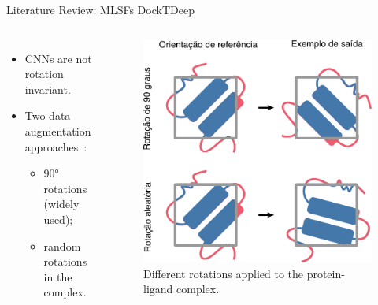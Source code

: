 \documentclass[aspectratio=169,xcolor=dvipsnames]{beamer}
\begin{document}
\begin{frame}{Literature Review: MLSFs \hfill {\footnotesize \alert{DockTDeep}}}

    \begin{columns}
        \begin{itemize}
            \item CNNs are not \alert{rotation invariant}.
            \item Two data augmentation approaches~\cite{da2025data}:
                  \begin{itemize}
                      \item 90° rotations (widely used);
                      \item random rotations in the complex.
                  \end{itemize}
        \end{itemize}

        \begin{figure}
            \centering
            \includegraphics[width=.85\linewidth]{imgs/rotation-types.png}
            \caption{Different rotations applied to the protein-ligand complex.}
        \end{figure}
    \end{columns}
\end{frame}
\end{document}
